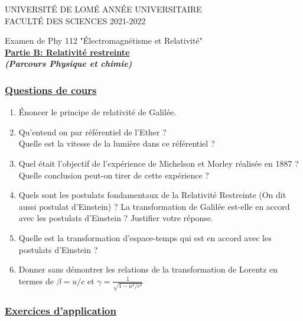 \documentclass[a4paper, 11pt]{report}
\begin{document}
\noindent
UNIVERSITÉ DE LOMÉ \hfill ANNÉE UNIVERSITAIRE \\
FACULTÉ DES SCIENCES \hfill 2021-2022

\begin{center}
  Examen de Phy 112 "Électromagnétisme et Relativité" \\ \vspace{0.2 cm}
  \bf \underline{Partie B: Relativité restreinte} \\ \vspace{0.2 cm}
  \it (Parcours Physique et chimie)
\end{center}

\subsubsection*{\underline{Questions de cours}}

\begin{enumerate}
  \item Énoncer le principe de relativité de Galilée.
  \item Qu'entend on par référentiel de l'Ether ? \\
  Quelle est la vitesse de la lumière dans ce référentiel ?
  \item Quel était l'objectif de l'expérience de Michelson et Morley réalisée en 1887 ? \\
  Quelle conclusion peut-on tirer de cette expérience ?
  \item Quels sont les postulats fondamentaux de la Relativité Restreinte (On dit aussi postulat d'Einstein) ? La transformation de Galilée est-elle en accord avec les postulats d'Einstein ? Justifier votre réponse.
  \item Quelle est la transformation d'espace-temps qui est en accord avec les postulats d'Einstein ?
  \item Donner sans démontrer les relations de la transformation de Lorentz en termes de $ \beta = u/c $ et $ \gamma = \frac{1}{\sqrt{1-{u^2}/{c^2}}} $
\end{enumerate}

\subsubsection*{\underline{Exercices d'application}}
\end{document}
